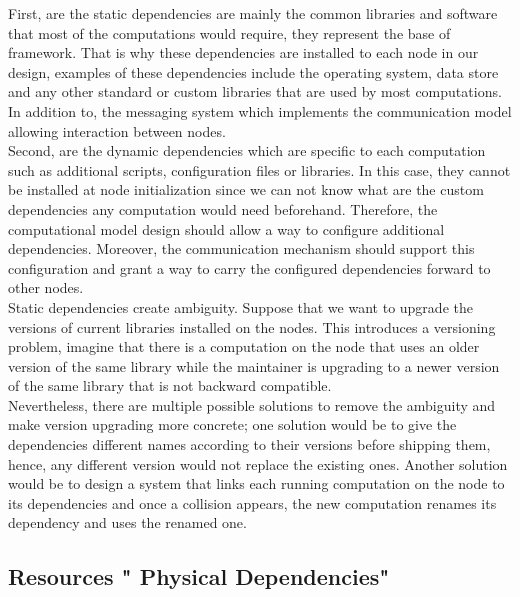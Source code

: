 \noindent First, are the static dependencies are mainly the common libraries and software that most of the computations would require, they represent the base of framework. That is why these dependencies are installed to each node in our design, examples of these dependencies include the operating system, data store and any other standard or custom libraries that are used by most computations. In addition to, the messaging system which implements the communication model allowing interaction between nodes. \\

\noindent Second, are the dynamic dependencies which are specific to each computation such as additional scripts, configuration files or libraries. In this case, they cannot be installed at node initialization since we can not know what are the custom dependencies any computation would need beforehand. Therefore, the computational model design should allow a way to configure additional dependencies. Moreover, the communication mechanism should support this configuration and grant a way to carry the configured dependencies forward to other nodes.\\
 
 
\noindent Static dependencies create ambiguity. Suppose that we want to upgrade the versions of current libraries installed on the nodes. This introduces a  versioning problem, imagine that there is a computation on the node that uses an older version of the same library while the maintainer is upgrading to a newer version of the same library that is not backward compatible.  \\
  
\noindent Nevertheless, there are multiple possible solutions to remove the ambiguity and make  version upgrading more concrete; one solution would be to give the dependencies different names according to their versions before shipping them, hence, any different version would not replace the existing ones. Another solution would be to design a system that links each running computation on the node to its dependencies and once a collision appears, the new computation renames its dependency and uses the renamed one.
 

\subsection {Resources " Physical Dependencies" }


